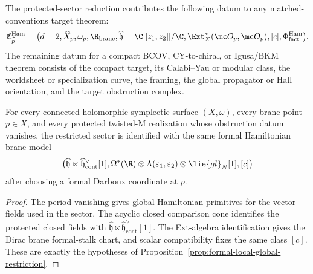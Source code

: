 \begin{defn}\label{defn:protected-sector-matched-conventions-contribution}
  The protected-sector reduction contributes the following datum to any
  matched-conventions target theorem:
  \[
  \mathfrak C_{\widehat p}^{\mathrm{Ham}}=
  \bigl(
    d=2,\widehat X_p,\omega_p,
    \R_{\mathrm{brane}},
    \widehat{\mathfrak h}=\C[[z_1,z_2]]/\C,
    \Ext_X^*(\mc O_p,\mc O_p),
    [\bar c],
    \Phi^{\mathrm{Ham}}_{\mathrm{fact}}
  \bigr).
  \]
  The remaining datum for a compact BCOV, CY-to-chiral, or Igusa/BKM
  theorem consists of the compact target, its Calabi--Yau or modular
  class, the worldsheet or specialization curve, the framing, the global
  propagator or Hall orientation, and the target obstruction complex.
\end{defn}

\begin{cor}\label{cor:protected-formal-uniformity}
  For every connected holomorphic-symplectic surface \((X,\omega)\), every
  brane point \(p\in X\), and every protected twisted-M realization whose
  obstruction datum vanishes, the restricted sector is identified with the
  same formal Hamiltonian brane model
  \[
    \bigl(\widehat{\mathfrak h}\ltimes
    \widehat{\mathfrak h}^{\vee}_{\mathrm{cont}}[1],
    \Omega^*(\R)\otimes\Lambda(\varepsilon_1,\varepsilon_2)
      \otimes\lie{gl}_N[1],
    [\bar c]\bigr)
  \]
  after choosing a formal Darboux coordinate at \(p\).
\end{cor}

\begin{proof}
  The period vanishing gives global Hamiltonian primitives for the vector
  fields used in the sector.  The acyclic closed comparison cone identifies
  the protected closed fields with
  \(\widehat{\mathfrak h}\ltimes
  \widehat{\mathfrak h}^{\vee}_{\mathrm{cont}}[1]\).  The Ext-algebra
  identification gives the Dirac brane formal-stalk chart, and scalar compatibility
	  fixes the same class \([\bar c]\).  These are exactly the hypotheses of
  Proposition~\ref{prop:formal-local-global-restriction}.
\end{proof}

